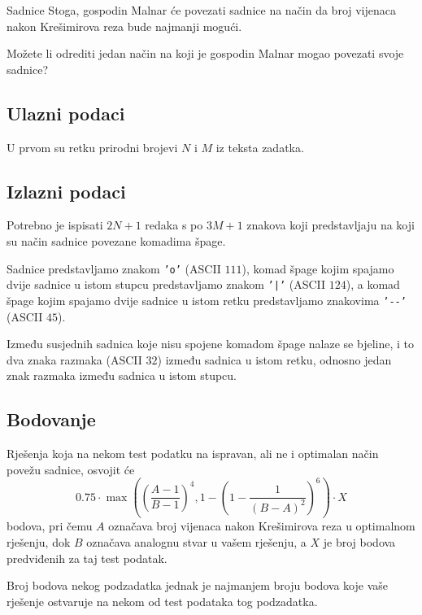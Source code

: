 \begin{statement}[
  problempoints=100,
  timelimit=3 sekunde,
  memorylimit=512 MiB,
]{Sadnice}
Stoga, gospodin Malnar će povezati sadnice na način da broj vijenaca nakon
Krešimirova reza bude najmanji mogući.

Možete li odrediti jedan način na koji je gospodin Malnar mogao povezati
svoje sadnice?

\subsection*{Ulazni podaci}
U prvom su retku prirodni brojevi $N$ i $M$ iz teksta zadatka.

\subsection*{Izlazni podaci}
Potrebno je ispisati $2N+1$ redaka s po $3M+1$ znakova koji predstavljaju
na koji su način sadnice povezane komadima špage.

Sadnice predstavljamo znakom \texttt{'o'} (ASCII $111$), komad špage kojim
spajamo dvije sadnice u istom stupcu predstavljamo znakom \texttt{'|'} (ASCII
$124$), a komad špage kojim spajamo dvije sadnice u istom retku predstavljamo
znakovima \texttt{'-{}-'} (ASCII $45$).

Između susjednih sadnica koje nisu spojene komadom
špage nalaze se bjeline, i to dva znaka razmaka (ASCII $32$) između sadnica u
istom retku, odnosno jedan znak razmaka između sadnica u istom stupcu.

\subsection*{Bodovanje}
Rješenja koja na nekom test podatku na ispravan, ali ne i optimalan način
povežu sadnice, osvojit će
$$ 0.75 \cdot \max \left(
\left( \frac{A - 1}{B - 1} \right)^4,
1 - \left( 1 - \frac{1}{(B - A)^2} \right)^6
\right) \cdot X$$
bodova, pri čemu $A$ označava broj vijenaca nakon Krešimirova reza u optimalnom
rješenju, dok $B$ označava analognu stvar u vašem rješenju, a $X$ je broj bodova
predviđenih za taj test podatak.

Broj bodova nekog podzadatka jednak je najmanjem broju bodova koje vaše rješenje
ostvaruje na nekom od test podataka tog podzadatka.


\end{statement}

